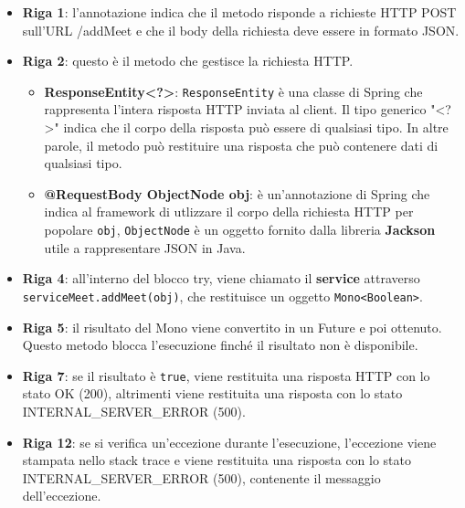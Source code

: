 \begin{itemize}
    \item \textbf{Riga 1}:
    l'annotazione indica che il metodo risponde a richieste HTTP POST sull'URL /addMeet 
    e che il body della richiesta deve essere in formato JSON.
  
    \item \textbf{Riga 2}:
    questo è il metodo che gestisce la richiesta HTTP. 
        \begin{itemize}
            \item \textbf{ResponseEntity\textless{}?{}\textgreater{}}: \texttt{ResponseEntity} è una classe di Spring che 
            rappresenta l'intera risposta HTTP inviata al client. Il tipo generico "\textless{}?\textgreater{}" indica che il corpo 
            della risposta può essere di qualsiasi tipo. In altre parole, il metodo può restituire una risposta che può 
            contenere dati di qualsiasi tipo.
            
            \item \textbf{@RequestBody ObjectNode obj}: è un'annotazione di Spring che indica al framework di 
            utlizzare il corpo della richiesta HTTP per popolare \texttt{obj}, \texttt{ObjectNode} è un oggetto fornito 
            dalla libreria \textbf{Jackson} utile a rappresentare JSON in Java.
            
        \end{itemize}
  
    \item \textbf{Riga 4}:
    all'interno del blocco try, viene chiamato il \textbf{service} attraverso
    \texttt{serviceMeet.addMeet(obj)}, che restituisce un oggetto 
    \texttt{Mono\textless{}Boolean\textgreater{}}. 
  
    \item \textbf{Riga 5}:
    il risultato del Mono viene convertito in un Future e poi ottenuto. Questo metodo blocca l'esecuzione 
    finché il risultato non è disponibile.
  
    \item \textbf{Riga 7}:
    se il risultato è \texttt{true}, viene restituita una risposta HTTP con lo stato OK (200), altrimenti
    viene restituita una risposta con lo stato INTERNAL_SERVER_ERROR (500).
  
    \item \textbf{Riga 12}:
    se si verifica un'eccezione durante l'esecuzione, l'eccezione viene stampata nello stack trace e viene 
    restituita una risposta con lo stato INTERNAL_SERVER_ERROR (500), contenente il messaggio dell'eccezione.
  \end{itemize}